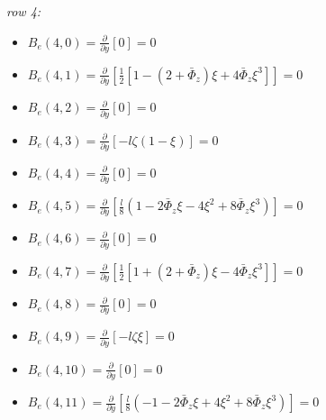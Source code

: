 \documentclass[a4paper,11pt]{article}
\newcommand{\gr}{\textbf}
\begin{document}
\noindent \textit{row 4:}
\begin{itemize}[label=$\gr{-}$, font=\LARGE, font=\color{color1}, topsep = 0.2cm, itemsep=0.2cm]
	\item $B_e(4,0) = \frac{\partial}{\partial y} \left[ 0 \right] = 0 $
	\item $B_e(4,1) = \frac{\partial}{\partial y} \left[ \frac{1}{2} \left[1 - (2 + \bar{\Phi}_z)\xi + 4\bar{\Phi}_z\xi^3 \right] \right] = 0 $
	\item $B_e(4,2) = \frac{\partial}{\partial y} \left[ 0 \right] = 0 $
	\item $B_e(4,3) = \frac{\partial}{\partial y} \left[ -l \zeta (1-\xi) \right] = 0 $
	\item $B_e(4,4) = \frac{\partial}{\partial y} \left[ 0 \right] = 0 $
	\item $B_e(4,5) = \frac{\partial}{\partial y} \left[ \frac{l}{8}\left(1 - 2\bar{\Phi}_z\xi - 4\xi^2 + 8\bar{\Phi}_z\xi^3 \right) \right] = 0 $
	\item $B_e(4,6) = \frac{\partial}{\partial y} \left[ 0 \right] = 0 $
	\item $B_e(4,7) = \frac{\partial}{\partial y} \left[ \frac{1}{2} \left[1 + (2 + \bar{\Phi}_z)\xi - 4\bar{\Phi}_z\xi^3 \right] \right] = 0 $
	\item $B_e(4,8) = \frac{\partial}{\partial y} \left[ 0 \right] = 0 $
	\item $B_e(4,9) = \frac{\partial}{\partial y} \left[ -l \zeta \xi \right] = 0 $
	\item $B_e(4,10) = \frac{\partial}{\partial y} \left[ 0 \right] = 0 $
	\item $B_e(4,11) = \frac{\partial}{\partial y} \left[ \frac{l}{8}\left( -1 - 2\bar{\Phi}_z\xi + 4\xi^2 + 8\bar{\Phi}_z\xi^3 \right) \right] = 0 $
\end{itemize}
\end{document}
